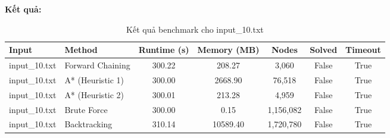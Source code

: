 \textbf{Kết quả:}
\begin{table}[H]
\centering
\begin{tabular}{|l|l|c|c|c|c|c|}
\hline
\textbf{Input} & \textbf{Method} & \textbf{Runtime (s)} & \textbf{Memory (MB)} & \textbf{Nodes} & \textbf{Solved} & \textbf{Timeout} \\
\hline
input\_10.txt & Forward Chaining & 300.22 & 208.27 & 3,060 & False & True \\
input\_10.txt & A* (Heuristic 1) & 300.00 & 2668.90 & 76,518 & False & True \\
input\_10.txt & A* (Heuristic 2) & 300.01 & 213.28 & 4,959 & False & True \\
input\_10.txt & Brute Force & 300.00 & 0.15 & 1,156,082 & False & True \\
input\_10.txt & Backtracking & 310.14 & 10589.40 & 1,720,780 & False & True \\
\hline
\end{tabular}
\caption{Kết quả benchmark cho input\_10.txt}
\end{table}


